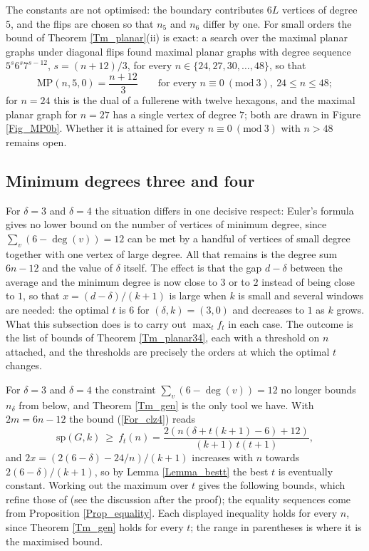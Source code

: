 \documentclass[12pt,a4paper]{article}%
\begin{document}


The constants are not optimised: the boundary contributes $6L$ vertices of degree $5$, and the flips
are chosen so that $n_{5}$ and $n_{6}$ differ by one. For small orders the bound of Theorem
\ref{Tm_planar}(ii) is exact: a search over the maximal planar graphs under diagonal flips found
maximal planar graphs with degree sequence $5^{s}6^{s}7^{s-12}$, $s=(n+12)/3$, for every
$n\in \{24,27,30,\ldots ,48\}$, so that
\[
\mathrm{MP}(n,5,0)=\frac{n+12}{3}\qquad \text{for every }n\equiv 0\ (\mathrm{mod}\ 3),\ 24\leq n\leq 48;
\]
for $n=24$ this is the dual of a fullerene with twelve hexagons, and the maximal planar graph for $n=27$
has a single vertex of degree $7$; both are drawn in Figure \ref{Fig_MP0b}.
Whether it is
attained for every $n\equiv 0\ (\mathrm{mod}\ 3)$ with $n>48$ remains open.

\subsection{Minimum degrees three and four}
\label{Sec_planar34}

For $\delta =3$ and $\delta =4$ the situation differs in one decisive respect:
Euler's formula gives no lower bound on the number of vertices of minimum
degree, since $\sum_{v}(6-\deg (v))=12$ can be met by a handful of vertices of
small degree together with one vertex of large degree. All that remains is the
degree sum $6n-12$ and the value of $\delta $ itself. The effect is that the
gap $d-\delta $ between the average and the minimum degree is now close to $3$
or to $2$ instead of being close to $1$, so that $x=(d-\delta )/(k+1)$ is large
when $k$ is small and several windows are needed: the optimal $t$ is $6$ for
$(\delta ,k)=(3,0)$ and decreases to $1$ as $k$ grows. What this subsection
does is to carry out $\max_{t}f_{t}$ in each case. The outcome is the list of
bounds of Theorem \ref{Tm_planar34}, each with a threshold on $n$ attached, and
the thresholds are precisely the orders at which the optimal $t$ changes.



For $\delta =3$ and $\delta =4$ the constraint $\sum_{v}(6-\deg (v))=12$ no longer bounds
$n_{\delta }$ from below, and Theorem \ref{Tm_gen} is the only tool we have. With $2m=6n-12$ the
bound (\ref{For_clz4}) reads
\[
\mathrm{sp}(G,k)\ \geq \ f_{t}(n)=\frac{2\left( n(\delta +t(k+1)-6)+12\right) }{(k+1)\,t(t+1)},
\]
and $2x=\left( 2(6-\delta )-24/n\right) /(k+1)$ increases with $n$ towards $2(6-\delta )/(k+1)$, so by
Lemma \ref{Lemma_bestt} the best $t$ is eventually constant. Working out the maximum over $t$ gives
the following bounds, which refine those of \cite{CaroLauriZarb,CaroWest} (see the discussion after the
proof); the equality sequences come from Proposition \ref{Prop_equality}. Each displayed inequality
holds for every $n$, since Theorem \ref{Tm_gen} holds for every $t$; the range in parentheses is where
it is the maximised bound.
\end{document}
